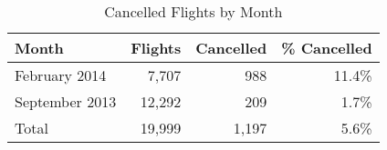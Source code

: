 \begin{table}[!htbp]
\centering
\caption{Cancelled Flights by Month} 
\label{tab:cancelled_by_month}
\begin{tabular}{lrrr}
  \toprule
Month & Flights & Cancelled & \% Cancelled \\ 
  \midrule
February 2014 &  7,707 &    988 & 11.4\% \\ 
  September 2013 & 12,292 &    209 & 1.7\% \\ 
  Total & 19,999 &  1,197 & 5.6\% \\ 
   \bottomrule
\end{tabular}
\end{table}
